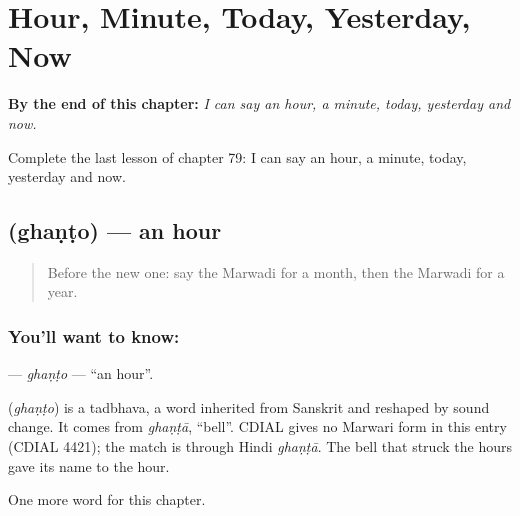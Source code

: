 
\chapter{Hour, Minute, Today, Yesterday, Now}
\label{ch:mw-hour-minute-today-yesterday-now}

\begin{chapteropening}
\textbf{By the end of this chapter:} \emph{I can say an hour, a minute, today, yesterday and now.}

Complete the last lesson of chapter 79: I can say an hour, a minute, today, yesterday and now.
\end{chapteropening}

\section[\texorpdfstring{\mw{घंटो} (ghaṇṭo)}{घंटो (ghaṇṭo)}]{ (ghaṇṭo) — an hour}

\label{lesson:MW-C79-ghanto}



\begin{quote}
Before the new one: say the Marwadi for a month, then the Marwadi for a year.
\end{quote}

\subsection*{You'll want to know: }
\textbf{} — \emph{ghaṇṭo} — \textquotedblleft{}an hour\textquotedblright{}.

\begin{cousinweb}
\textbf{} (\emph{ghaṇṭo}) is a tadbhava, a word inherited from Sanskrit and reshaped by sound change. It comes from \emph{ghaṇṭā}, \textquotedblleft{}bell\textquotedblright{}. CDIAL gives no Marwari form in this entry (CDIAL 4421); the match is through Hindi \emph{ghaṇṭā}. The bell that struck the hours gave its name to the hour.
\end{cousinweb}

\begin{grammarlens}[title={What you've built}]
One more word for this chapter.
\end{grammarlens}

